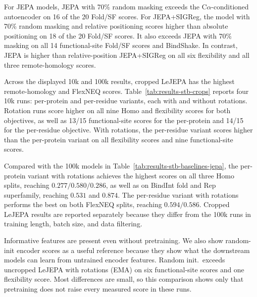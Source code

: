 For JEPA models, JEPA with 70\% random masking exceeds the C$\alpha$-conditioned autoencoder on 16 of the 20 Fold/SF scores.
For JEPA+SIGReg, the model with 70\% random masking and relative positioning scores higher than absolute positioning on 18 of the 20 Fold/SF scores.
It also exceeds JEPA with 70\% masking on all 14 functional-site Fold/SF scores and BindShake.
In contrast, JEPA is higher than relative-position JEPA+SIGReg on all six flexibility and all three remote-homology scores.

Across the displayed 10k and 100k results, cropped LeJEPA has the highest remote-homology and FlexNEQ scores.
Table~\ref{tab:results-stb-crops} reports four 10k runs: per-protein and per-residue variants, each with and without rotations.
Rotation runs score higher on all nine Homo and flexibility scores for both objectives, as well as 13/15 functional-site scores for the per-protein and 14/15 for the per-residue objective.
With rotations, the per-residue variant scores higher than the per-protein variant on all flexibility scores and nine functional-site scores.

Compared with the 100k models in Table~\ref{tab:results-stb-baselines-jepa}, the per-protein variant with rotations achieves the highest scores on all three Homo splits, reaching $0.277/0.580/0.286$, as well as on BindInt fold and Rep superfamily, reaching $0.531$ and $0.874$. The per-residue variant with rotations performs the best on both FlexNEQ splits, reaching $0.594/0.586$.
Cropped LeJEPA results are reported separately because they differ from the 100k runs in training length, batch size, and data filtering.

Informative features are present even without pretraining.
We also show random-init encoder scores as a useful reference because they show what the downstream models can learn from untrained encoder features.
Random init.\ exceeds uncropped LeJEPA with rotations (EMA) on six functional-site scores and one flexibility score. 
Most differences are small, so this comparison shows only that pretraining does not raise every measured score in these runs.



